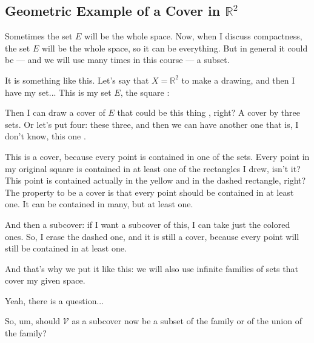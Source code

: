 \subsection{Geometric Example of a Cover in \texorpdfstring{$\mathbb{R}^2$}{R2}}

\begin{speech}[00:49:50 - 00:50:33]
Sometimes the set $E$ will be the whole space. Now, when I discuss compactness, the set $E$ will be the whole space, so it can be everything. But in general it could be --- and we will use many times in this course --- a subset.

It is something like this. Let's say that $X = \mathbb{R}^2$  to make a drawing, and then I have my set... This is my set $E$, the square :
\end{speech}

\begin{speech}[00:50:33 - 00:51:43]
Then I can draw a cover of $E$ that could be this thing , right? A cover by three sets. Or let's put four: these three, and then we can have another one that is, I don't know, this one .

This is a cover, because every point is contained in one of the sets. Every point in my original square is contained in at least one of the rectangles I drew, isn't it? This point is contained actually in the yellow and in the dashed rectangle, right? The property to be a cover is that every point should be contained in at least one. It can be contained in many, but at least one.

And then a subcover: if I want a subcover of this, I can take just the colored ones. So, I erase the dashed one, and it is still a cover, because every point will still be contained in at least one.
\end{speech}

\begin{speech}[00:51:43 - 00:52:13]
And that's why we put it like this: we will also use infinite families of sets that cover my given space.

Yeah, there is a question... 
\end{speech}

\begin{student}
So, um, should $\mathcal{V}$ as a subcover now be a subset of the family or of the union of the family?
\end{student}

